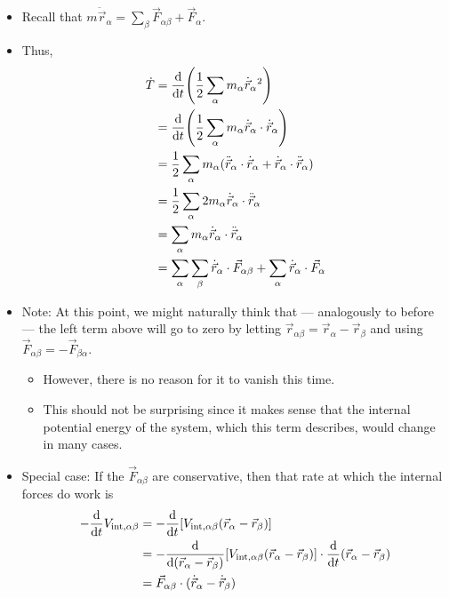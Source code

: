 \documentclass[../notes.tex]{subfiles}
\begin{document}
\begin{itemize}
\begin{itemize}
        \item Recall that $m\ddot{\vec{r}}_\alpha=\sum_\beta\vec{F}_{\alpha\beta}+\vec{F}_\alpha$.
        \item Thus,
        \begin{align*}
            \dot{T} &= \dv{t}(\frac{1}{2}\sum_\alpha m_\alpha\dot{\vec{r}}_\alpha{}^2)\\
            &= \dv{t}(\frac{1}{2}\sum_\alpha m_\alpha\dot{\vec{r}}_\alpha\cdot\dot{\vec{r}}_\alpha)\\
            &= \frac{1}{2}\sum_\alpha m_\alpha(\ddot{\vec{r}}_\alpha\cdot\dot{\vec{r}}_\alpha+\dot{\vec{r}}_\alpha\cdot\ddot{\vec{r}}_\alpha)\\
            &= \frac{1}{2}\sum_\alpha 2m_\alpha\dot{\vec{r}}_\alpha\cdot\ddot{\vec{r}}_\alpha\\
            &= \sum_\alpha m_\alpha\dot{\vec{r}}_\alpha\cdot\ddot{\vec{r}}_\alpha\\
            &= \sum_\alpha\sum_\beta\dot{\vec{r}}_\alpha\cdot\vec{F}_{\alpha\beta}+\sum_\alpha\dot{\vec{r}}_\alpha\cdot\vec{F}_\alpha
        \end{align*}
        \item Note: At this point, we might naturally think that --- analogously to before --- the left term above will go to zero by letting $\vec{r}_{\alpha\beta}=\vec{r}_\alpha-\vec{r}_\beta$ and using $\vec{F}_{\alpha\beta}=-\vec{F}_{\beta\alpha}$.
        \begin{itemize}
            \item However, there is no reason for it to vanish this time.
            \item This should not be surprising since it makes sense that the internal potential energy of the system, which this term describes, would change in many cases.
        \end{itemize}
        \item Special case: If the $\vec{F}_{\alpha\beta}$ are conservative, then that rate at which the internal forces do work is
        \begin{align*}
            -\dv{t}V_{\text{int},\alpha\beta} &= -\dv{t}[V_{\text{int},\alpha\beta}(\vec{r}_\alpha-\vec{r}_\beta)]\\
            &= -\dv{(\vec{r}_\alpha-\vec{r}_\beta)}[V_{\text{int},\alpha\beta}(\vec{r}_\alpha-\vec{r}_\beta)]\cdot\dv{t}(\vec{r}_\alpha-\vec{r}_\beta)\\
            &= \vec{F}_{\alpha\beta}\cdot(\dot{\vec{r}}_\alpha-\dot{\vec{r}}_\beta)\\

\end{align*}
\end{itemize}
\end{itemize}
\end{document}
